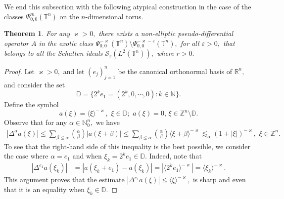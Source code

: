 \documentclass[12pt, reqno]{amsart}
\newtheorem{theorem}{Theorem}[section]
\theoremstyle{definition}
\theoremstyle{remark}
\numberwithin{equation}{section}
\begin{document}
We end this subsection with the following atypical construction in the case of the classes $\Psi^{m}_{0,0}(\mathbb{T}^n
)$ on the $n$-dimensional torus.

\begin{theorem}\label{The:atypical:case}
    For any $\varkappa>0,$ there exists a {non-elliptic} pseudo-differential operator $A$ in the exotic class   $\Psi^{-\varkappa}_{0,0}(\mathbb{T}^n
)\setminus \Psi^{-\varkappa-\varepsilon}_{0,0}(\mathbb{T}^n
), $ for all $\varepsilon>0,$ that belongs to all the Schatten ideals $\mathscr{S}_r(L^2(\mathbb{T}^n)),$ where $r>0.$
\end{theorem}
\begin{proof}Let $\varkappa>0,$ and let $(e_{j})_{j=1}^n$ be the canonical orthonormal basis of $\mathbb{R}^n,$  and consider the set 
\begin{equation}
    \mathbb{D}=\{ 2^{k}e_{1}=(2^k,0,\cdots, 0):k\in \mathbb{N}
    \}.
\end{equation}Define the symbol
\begin{equation}
    a(\xi)=\langle\xi\rangle^{-\varkappa},\,\,\xi\in \mathbb{D};\,\,a(\xi)=0,\,\xi\in \mathbb{Z}^n\setminus \mathbb{D}.
\end{equation}Observe that for any $\alpha\in \mathbb{N}_0^n,$ we have
\begin{align*}
    |\Delta^\alpha a(\xi)|\leq \sum_{\beta\leq \alpha}{{\alpha}\choose{\beta}}|a(\xi+\beta)|\leq \sum_{\beta\leq \alpha}{{\alpha}\choose{\beta}}\langle \xi+\beta\rangle^{-\varkappa}\lesssim_{\alpha}(1+|\xi|)^{-\varkappa },\,\,\xi\in \mathbb{Z}^n. 
\end{align*}To see that the right-hand side of this inequality  is the best possible, we consider the case where $\alpha=e_1$ and when $\xi_k=2^{k}e_{1}\in \mathbb{D}.$ Indeed, note that
\begin{align*}
    |\Delta^{e_1}a(\xi_k)| &=|a(\xi_k+e_1)-a(\xi_k)|=|\langle 2^ke_1 \rangle^{-\varkappa}|
    = \langle \xi_k\rangle^{-\varkappa}  .
\end{align*} This argument proves that the estimate $|\Delta^{e_1}a(\xi)| \leq \langle \xi\rangle^{-\varkappa}  ,$ is sharp and even that it is an equality when $\xi_k\in \mathbb{D}.$    


\end{proof}
\end{document}
